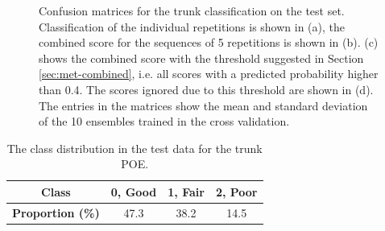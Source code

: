 \begin{figure}[h]
\begin{subfigure}[t]{0.48\textwidth}
      \caption{}
      \label{fig:trunk-cnf-ignored}
  \end{subfigure}
  \caption{Confusion matrices for the trunk classification on the test set. Classification of the individual repetitions is shown in (a), the combined score for the sequences of 5 repetitions is shown in (b). (c) shows the combined score with the threshold suggested in Section \ref{sec:met-combined}, i.e. all scores with a predicted probability higher than 0.4. The scores ignored due to this threshold are shown in (d). The entries in the matrices show the mean and standard deviation of the 10 ensembles trained in the cross validation.}
  \label{fig:trunk-cnfs}
\end{figure}

\begin{table}[h]
  \caption{The class distribution in the test data for the trunk POE.}
  \label{tab:trunk-class-dist}
  \centering
  \begin{tabu}[c]{cccc}
    \textbf{Class}            & 0, Good & 1, Fair & 2, Poor \\ \hline \hline
    \textbf{Proportion (\%)}  & 47.3 & 38.2 & 14.5
  \end{tabu}
\end{table}


